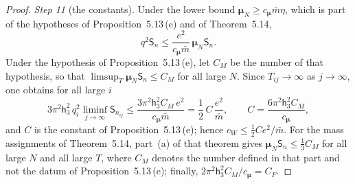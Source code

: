 \documentclass[11pt,letterpaper,reqno]{amsart}
\theoremstyle{definition}
\begin{document}
\begin{proof}
\emph{Step 11} (the constants).
Under the lower bound $\boldsymbol\mu_N\ge c_{\boldsymbol\mu}\bar m\eta$, which is part of the hypotheses of Proposition~5.13\,(e) and of Theorem~5.14,
\begin{equation*}
q^2\mathsf S_n\le\frac{e^2}{c_{\boldsymbol\mu}\bar m}\,\boldsymbol\mu_N\mathsf S_n.
\end{equation*}
Under the hypothesis of Proposition~5.13\,(e), let $C_M$ be the number of that hypothesis, so that $\limsup_T\boldsymbol\mu_N\mathsf S_n\le C_M$ for all large $N$.
Since $T_{ij}\to\infty$ as $j\to\infty$, one obtains for all large $i$
\begin{equation*}
3\pi^2\mathsf h_3^2\,q_i^2\liminf_{j\to\infty}\mathsf S_{n_{ij}}\le\frac{3\pi^2\mathsf h_3^2C_M\,e^2}{c_{\boldsymbol\mu}\bar m}=\frac12\,C\,\frac{e^2}{\bar m},\qquad C=\frac{6\pi^2\mathsf h_3^2C_M}{c_{\boldsymbol\mu}},
\end{equation*}
and $C$ is the constant of Proposition~5.13\,(e); hence $c_W\le\frac12Ce^2/\bar m$.
For the mass assignments of Theorem~5.14, part~(a) of that theorem gives $\boldsymbol\mu_N\mathsf S_n\le\frac13C_M$ for all large $N$ and all large $T$, where $C_M$ denotes the number defined in that part and not the datum of Proposition~5.13\,(e);
finally, $2\pi^2\mathsf h_3^2C_M/c_{\boldsymbol\mu}=C_F$.
\end{proof}
\end{document}
